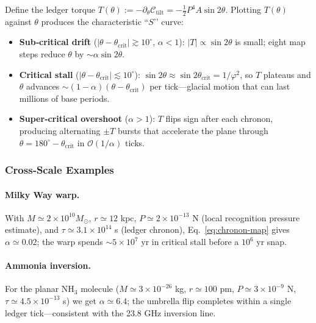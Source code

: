 \documentclass[11pt,oneside]{book}
\begin{document}
Define the ledger torque  
$T(\theta) := -\partial_{\theta}\mathcal C_{\text{tilt}}
             = -\tfrac12 P^{4}A\sin2\theta$.
Plotting $T(\theta)$ against $\theta$ produces the characteristic
``\(S\)’’ curve:

\begin{itemize}[leftmargin=*]
  \item \textbf{Sub‐critical drift}  
        ($|\theta-\theta_{\text{crit}}|\gtrsim10^\circ$,
        $\alpha<1$):  
        $|T|\propto\sin2\theta$ is small; eight map steps reduce
        $\theta$ by $\sim\alpha\sin2\theta$.
  \item \textbf{Critical stall}  
        ($|\theta-\theta_{\text{crit}}|\lesssim10^\circ$):  
        $\sin2\theta\approx\sin2\theta_{\text{crit}}=1/\varphi^{2}$,
        so $T$ plateaus and  
        $\theta$ advances $\sim(1-\alpha)(\theta-\theta_{\text{crit}})$
        per tick—glacial motion that can last millions of base periods.
  \item \textbf{Super‐critical overshoot}  
        ($\alpha>1$):  
        $T$ flips sign after each chronon, producing alternating
        $\pm T$ bursts that accelerate the plane through  
        $\theta=180^\circ-\theta_{\text{crit}}$ in
        $\mathcal O(1/\alpha)$ ticks.
\end{itemize}

\subsubsection{Cross‐Scale Examples}
\label{ss:tilt-examples}

\paragraph{Milky Way warp.}
With $M\simeq2\times10^{10}M_\odot$, $r\simeq12$ kpc,
$P\simeq2\times10^{-13}$ N (local recognition pressure estimate),
and $\tau\simeq3.1\times10^{14}$ s (ledger chronon),
Eq.~\eqref{eq:chronon-map} gives $\alpha\simeq0.02$;
the warp spends $\sim5\times10^{7}$ yr in critical stall before a
$10^{6}$ yr snap.

\paragraph{Ammonia inversion.}
For the planar NH$_3$ molecule ($M\simeq3\times10^{-26}$ kg,
$r\simeq100$ pm, $P\simeq3\times10^{-9}$ N,
$\tau\simeq4.5\times10^{-13}$ s) we get $\alpha\simeq6.4$;
the umbrella flip completes within a single ledger tick—consistent
with the 23.8 GHz inversion line.
\end{document}
